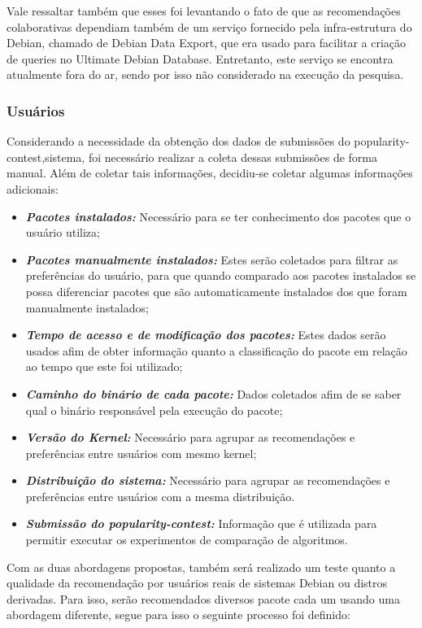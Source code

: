 Vale ressaltar também que esses foi levantando o fato de que as recomendações
colaborativas dependiam também de um serviço fornecido pela infra-estrutura do
Debian, chamado de Debian Data Export, que era usado para facilitar a criação de
queries no Ultimate Debian Database. Entretanto, este serviço se encontra
atualmente fora do ar, sendo por isso não considerado na execução da pesquisa.

\subsubsection{Usuários}

Considerando a necessidade da obtenção dos dados de submissões do
popularity-contest,sistema, foi necessário realizar a coleta dessas submissões
de forma manual. Além de coletar tais informações, decidiu-se coletar algumas
informações adicionais:

\begin{itemize}
    \item \textit{\textbf{Pacotes instalados:}} Necessário para se ter conhecimento dos pacotes que o usuário utiliza;
    \item \textit{\textbf{Pacotes manualmente instalados:}} Estes serão coletados para filtrar as preferências do usuário, para que quando comparado aos pacotes instalados se possa diferenciar pacotes que são automaticamente instalados dos que foram manualmente instalados;
    \item \textit{\textbf{Tempo de acesso e de modificação dos pacotes:}} Estes dados serão usados afim de obter informação quanto a classificação do pacote em relação ao tempo que este foi utilizado;
    \item \textit{\textbf{Caminho do binário de cada pacote:}} Dados coletados afim de se saber qual o binário responsável pela execução do pacote;
    \item \textit{\textbf{Versão do Kernel:}} Necessário para agrupar as recomendações e preferências entre usuários com mesmo kernel;
    \item \textit{\textbf{Distribuição do sistema:}} Necessário para agrupar as recomendações e preferências entre usuários com a mesma distribuição.
    \item \textit{\textbf{Submissão do popularity-contest:}} Informação que é
        utilizada para permitir executar os experimentos de comparação de
        algoritmos.
\end{itemize}

Com as duas abordagens propostas, também será realizado um teste quanto a
qualidade da recomendação por usuários reais de sistemas Debian ou distros
derivadas. Para isso, serão recomendados diversos pacote cada um usando uma
abordagem diferente, segue para isso o seguinte processo foi definido:

